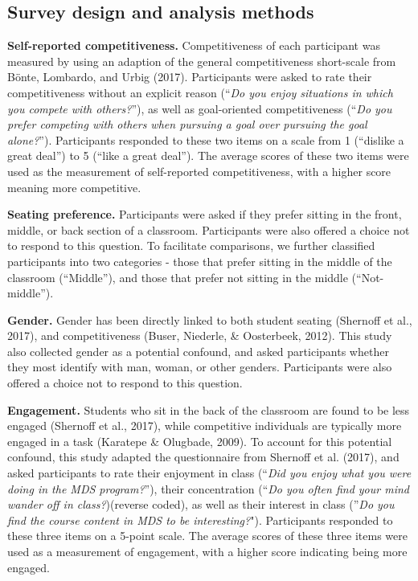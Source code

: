 \documentclass[man]{apa6}
\begin{document}
\hypertarget{survey-design-and-analysis-methods}{%
\subsection{Survey design and analysis methods}\label{survey-design-and-analysis-methods}}

\textbf{Self-reported competitiveness.} Competitiveness of each participant was measured by using an adaption of the general competitiveness short-scale from Bönte, Lombardo, and Urbig (2017). Participants were asked to rate their competitiveness without an explicit reason (\enquote{\emph{Do you enjoy situations in which you compete with others?}}), as well as goal-oriented competitiveness (\enquote{\emph{Do you prefer competing with others when pursuing a goal over pursuing the goal alone?}}). Participants responded to these two items on a scale from 1 (\enquote{dislike a great deal}) to 5 (\enquote{like a great deal}). The average scores of these two items were used as the measurement of self-reported competitiveness, with a higher score meaning more competitive.

\textbf{Seating preference.} Participants were asked if they prefer sitting in the front, middle, or back section of a classroom. Participants were also offered a choice not to respond to this question. To facilitate comparisons, we further classified participants into two categories - those that prefer sitting in the middle of the classroom (\enquote{Middle}), and those that prefer not sitting in the middle (\enquote{Not-middle}).

\textbf{Gender.} Gender has been directly linked to both student seating (Shernoff et al., 2017), and competitiveness (Buser, Niederle, \& Oosterbeek, 2012). This study also collected gender as a potential confound, and asked participants whether they most identify with man, woman, or other genders. Participants were also offered a choice not to respond to this question.

\textbf{Engagement.} Students who sit in the back of the classroom are found to be less engaged (Shernoff et al., 2017), while competitive individuals are typically more engaged in a task (Karatepe \& Olugbade, 2009). To account for this potential confound, this study adapted the questionnaire from Shernoff et al. (2017), and asked participants to rate their enjoyment in class (\enquote{\emph{Did you enjoy what you were doing in the MDS program?}}), their concentration (\enquote{\emph{Do you often find your mind wander off in class?})(reverse coded), as well as their interest in class (}\emph{Do you find the course content in MDS to be interesting?}"). Participants responded to these three items on a 5-point scale. The average scores of these three items were used as a measurement of engagement, with a higher score indicating being more engaged.
\end{document}
